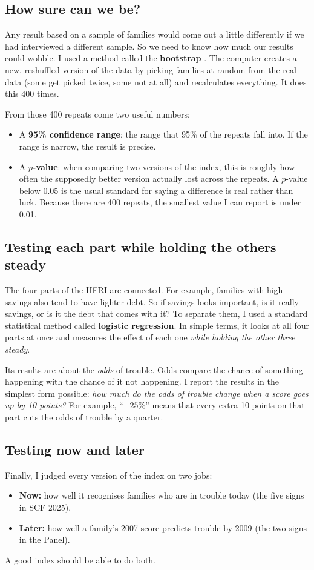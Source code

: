 \documentclass[11pt,a4paper]{article}
\newcommand{\pct}{\%}
\begin{document}
\subsection{How sure can we be?}
Any result based on a sample of families would come out a little differently if we had interviewed a different sample.
So we need to know how much our results could wobble. I used a method called the \textbf{bootstrap} \cite{efron1993}.
The computer creates a new, reshuffled version of the data by picking families at random from the real data (some get
picked twice, some not at all) and recalculates everything. It does this 400 times.

From those 400 repeats come two useful numbers:
\begin{itemize}
\item A \textbf{95\pct{} confidence range}: the range that 95\pct{} of the repeats fall into. If the range is narrow,
the result is precise.
\item A \textbf{$p$-value}: when comparing two versions of the index, this is roughly how often the supposedly better
version actually lost across the repeats. A $p$-value below 0.05 is the usual standard for saying a difference is real
rather than luck. Because there are 400 repeats, the smallest value I can report is under 0.01.
\end{itemize}

\subsection{Testing each part while holding the others steady}
The four parts of the HFRI are connected. For example, families with high savings also tend to have lighter debt. So
if savings looks important, is it really savings, or is it the debt that comes with it? To separate them, I used a
standard statistical method called \textbf{logistic regression}. In simple terms, it looks at all four parts at once and
measures the effect of each one \emph{while holding the other three steady}.

Its results are about the \emph{odds} of trouble. Odds compare the chance of something happening with the chance of it
not happening. I report the results in the simplest form possible: \emph{how much do the odds of trouble change when a
score goes up by 10 points?} For example, ``$-25\pct$'' means that every extra 10 points on that part cuts the odds of
trouble by a quarter.

\subsection{Testing now and later}
Finally, I judged every version of the index on two jobs:
\begin{itemize}
\item \textbf{Now:} how well it recognises families who are in trouble today (the five signs in SCF 2025).
\item \textbf{Later:} how well a family's 2007 score predicts trouble by 2009 (the two signs in the Panel).
\end{itemize}
A good index should be able to do both.
\end{document}
